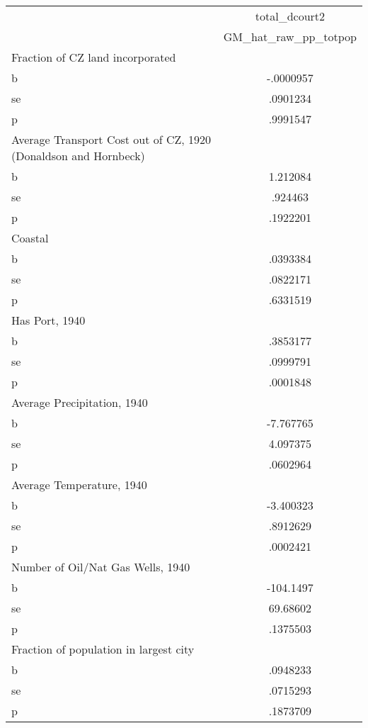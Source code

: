 \begin{tabular}{l*{1}{c}}
\toprule
                &total\_dcourt2\\
                &GM\_hat\_raw\_pp\_totpop\\
\midrule
Fraction of CZ land incorporated&         \\
b               &-.0000957\\
se              & .0901234\\
p               & .9991547\\
\midrule
Average Transport Cost out of CZ, 1920 (Donaldson and Hornbeck)&         \\
b               & 1.212084\\
se              &  .924463\\
p               & .1922201\\
\midrule
Coastal         &         \\
b               & .0393384\\
se              & .0822171\\
p               & .6331519\\
\midrule
Has Port, 1940  &         \\
b               & .3853177\\
se              & .0999791\\
p               & .0001848\\
\midrule
Average Precipitation, 1940&         \\
b               &-7.767765\\
se              & 4.097375\\
p               & .0602964\\
\midrule
Average Temperature, 1940&         \\
b               &-3.400323\\
se              & .8912629\\
p               & .0002421\\
\midrule
Number of Oil/Nat Gas Wells, 1940&         \\
b               &-104.1497\\
se              & 69.68602\\
p               & .1375503\\
\midrule
Fraction of population in largest city&         \\
b               & .0948233\\
se              & .0715293\\
p               & .1873709\\

\end{tabular}
